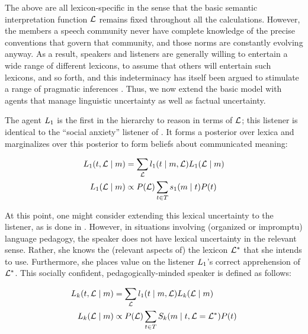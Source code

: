 The above are all lexicon-specific in the sense that the basic
semantic interpretation function $\mathcal{L}$ remains fixed throughout all
the calculations.  However, the members a speech community never have
complete knowledge of the precise conventions that govern that
community, and those norms are constantly evolving anyway. As a
result, speakers and listeners are generally willing to entertain a
wide range of different lexicons, to assume that others will entertain
such lexicons, and so forth, and this indeterminacy has itself been
argued to stimulate a range of pragmatic inferences
\cite{Bergen:Goodman:Levy:2012,Bergen:Goodman:2014}. Thus, we now
extend the basic model with agents that manage linguistic uncertainty
as well as factual uncertainty.

The agent $\ListenerOne$ is the first in the hierarchy to reason in
terms of $\mathcal{L}$; this listener is identical to the ``social anxiety''
listener of \cite{Smith:Goodman:Frank:2013}. It forms a posterior over
lexica and marginalizes over this posterior to form beliefs about
communicated meaning:

\begin{definition}[$\ListenerOne$]\label{def:l1}
  \begin{align*}
  L_{1}(t, \mathcal{L} \mid m) 
  &= 
  \sum_{\mathcal{L}} l_{1}(t \mid m, \mathcal{L}) L_{1}(\mathcal{L} \mid m) 
  \\
  L_{1}(\mathcal{L} \mid m) &\propto P(\mathcal{L}) \sum_{t\in T} s_{1}(m \mid t)P(t)
  \end{align*}
\end{definition}


At this point, one might consider extending this lexical uncertainty
to the listener, as is done in \cite{Smith:Goodman:Frank:2013}.
However, in situations involving (organized or impromptu) language
pedagogy, the speaker does not have lexical uncertainty in the
relevant sense.  Rather, she knows the (relevant aspects of) the
lexicon $\mathcal{L}^{\ast}$ that she intends to use. Furthermore, she places
value on the listener $\ListenerOne$'s correct apprehension of
$\mathcal{L}^{\ast}$. This socially confident, pedagogically-minded speaker is
defined as follows:

\begin{definition}[$\ListenerK$]\label{def:l1}
  \begin{align*}
  L_{k}(t, \mathcal{L} \mid m) 
  &= 
  \sum_{\mathcal{L}} l_{1}(t \mid m, \mathcal{L}) L_{k}(\mathcal{L} \mid m) 
  \\
  L_{k}(\mathcal{L} \mid m) &\propto P(\mathcal{L}) \sum_{t\in T} S_{k}(m \mid t, \mathcal{L} = \mathcal{L}^{\ast})P(t)
  \end{align*}
\end{definition}


